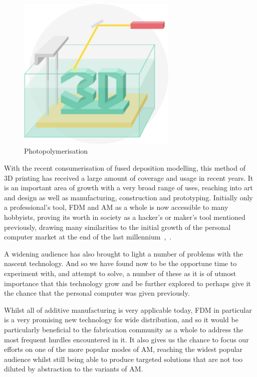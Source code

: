 \documentclass[pdftex, 11pt]{report} %
\begin{document}
\begin{figure}[H]
  \centering
  \includegraphics[width=3in]{sla.png}
  \caption{Photopolymerisation~\cite{THRE3D2014}}
  \label{figure:SLA}
\end{figure}

With the recent consumerisation of fused deposition modelling, this method of 3D printing has received a large amount of coverage and usage in recent years. It is an important area of growth with a very broad range of uses, reaching into art and design as well as manufacturing, construction and prototyping. Initially only a professional's tool, FDM and AM as a whole is now accessible to many hobbyists, proving its worth in society as a hacker's or maker's tool mentioned previously, drawing many similarities to the initial growth of the personal computer market at the end of the last millennium~\cite{Love2012},~\cite{Love2013}.

A widening audience has also brought to light a number of problems with the nascent technology. And so we have found now to be the opportune time to experiment with, and attempt to solve, a number of these as it is of utmost importance that this technology grow and be further explored to perhaps give it the chance that the personal computer was given previously.

Whilst all of additive manufacturing is very applicable today, FDM in particular is a very promising new technology for wide distribution, and so it would be particularly beneficial to the fabrication community as a whole to address the most frequent hurdles encountered in it. It also gives us the chance to focus our efforts on one of the more popular modes of AM, reaching the widest popular audience whilst still being able to produce targeted solutions that are not too diluted by abstraction to the variants of AM.
\end{document}
